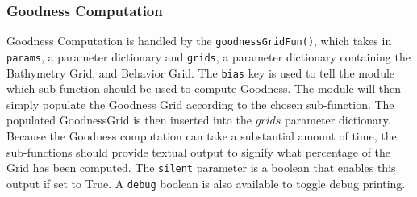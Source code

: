 \subsubsection{Goodness Computation}
Goodness Computation is handled by the \texttt{goodnessGridFun()}, which takes in \texttt{params}, a parameter dictionary and \texttt{grids}, a parameter dictionary containing the Bathymetry Grid, and Behavior Grid.  The \texttt{bias} key is used to tell the module which sub-function should be used to compute Goodness.  The module will then simply populate the Goodness Grid according to the chosen sub-function.  The populated GoodnessGrid is then inserted into the $grids$ parameter dictionary.  Because the Goodness computation can take a substantial amount of time, the sub-functions should provide textual output to signify what percentage of the Grid has been computed.  The \texttt{silent} parameter is a boolean that enables this output if set to True.  A \texttt{debug} boolean is also available to toggle debug printing.


